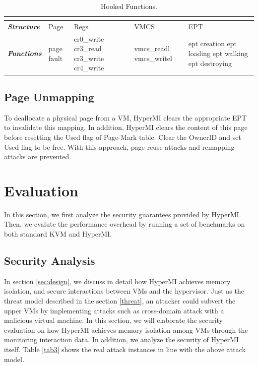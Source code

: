 \documentclass[conference]{IEEEtran}
\begin{document}
\begin{table}
\centering
\caption{Hooked Functions.}\label{tabhook}
\begin{tabular}{p{1cm}|p{1.2cm}|p{1.1cm}|p{1.4cm}|p{1.6cm}}
\hline
\multicolumn{5}{c}{\bfseries\textbf\centering{Hooked Functions}}\\
\hline
{\itshape\bfseries Structure} & Page & Regs & VMCS & EPT \\
\hline
{\itshape\bfseries Functions} &page fault & cr0\_write cr3\_read cr3\_write cr4\_write & vmcs\_readl vmcs\_writel & ept creation ept loading ept walking ept destroying \\
\hline
\end{tabular}
\end{table}

\subsection {Page Unmapping}

To deallocate a physical page from a VM, HyperMI clears the appropriate EPT to invalidate this mapping. In addition, HyperMI clears the content of this page before resetting the Used flag of Page-Mark table. Clear the OwnerID and set Used flag to be free. With this approach, page reuse attacks and remapping attacks are prevented.
\fi


\section{Evaluation}\label{sec:evaluation}
In this section, we first analyze the security guarantees provided by HyperMI. Then, we evalute the performance overhead by running a set of benchmarks on both standard KVM and HyperMI.



\subsection{Security Analysis}
 
In section \ref{sec:design}, we discuss in detail how HyperMI achieves memory isolation, and secure interactions between VMs and the hypervisor. Just as the threat model described in the section \ref{threat}, an attacker could subvert the upper VMs by implementing attacks such as cross-domain attack with a malicious virtual machine.
In this section, we will elaborate the security evaluation on how HyperMI achieves memory isolation among VMs through the monitoring interaction data. 
In addition, we analyze the security of HyperMI itself. Table \ref{tab3} shows the real attack instances in line with the above attack model. 
\end{document}
